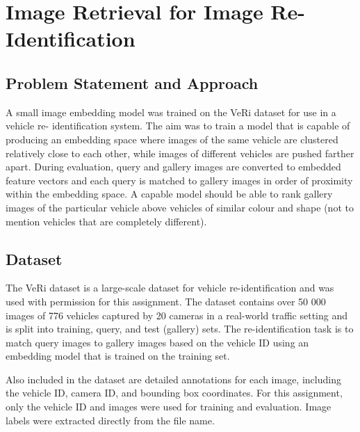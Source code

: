\documentclass{article}
\theoremstyle{plain}
\theoremstyle{definition}
\theoremstyle{remark}
\begin{document}
\onecolumn


\begin{icmlauthorlist}
\end{icmlauthorlist}

\section{Image Retrieval for Image Re-Identification}


\subsection{Problem Statement and Approach}

A small image embedding model was trained on the 
VeRi dataset \cite{XinchenLiu16a} for use in a vehicle re-
identification system. The aim was to train a model that is capable of 
producing an embedding space where images of the same vehicle are clustered 
relatively close to each other, while images of different vehicles are pushed 
farther apart. During evaluation, query and gallery images are converted 
to embedded feature vectors 
and each query is matched to gallery images in order of proximity within 
the embedding space. A capable model should be able to rank gallery images of 
the particular vehicle above vehicles of similar colour and shape (not to 
mention vehicles that are completely different).

\subsection{Dataset}

The VeRi dataset \cite{XinchenLiu16a} is a large-scale dataset for vehicle 
re-identification and was used with permission for this assignment. The dataset 
contains over 50 000 images of 776 vehicles captured by 20 cameras in a 
real-world traffic setting and is split into training, query, and test (gallery) sets. The 
re-identification task is to match query images to gallery images based on the 
vehicle ID using an embedding model that is trained on the training set.

Also included in the dataset are detailed annotations for each image, including 
the vehicle ID, camera ID, and bounding box coordinates. For this assignment, 
only the vehicle ID and images were used for training and evaluation. Image 
labels were extracted directly from the file name. 
\end{document}
